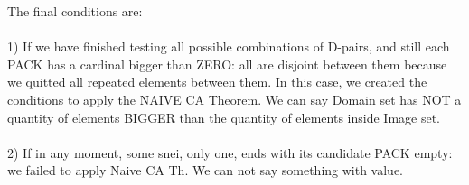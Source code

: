 	\noindent
	The final conditions are:\\\\
	1) If we have finished testing all possible combinations of D-pairs, and still each PACK has a cardinal bigger than ZERO: all are disjoint between them because we quitted all repeated elements between them. In this case, we created the conditions to apply the NAIVE CA Theorem. We can say Domain set has NOT a quantity of elements BIGGER than the quantity of elements inside Image set.\\\\
	2) If in any moment, some snei, only one, ends with its candidate PACK empty: we failed to apply Naive CA Th. We can not say something with value.
	\\\\
	 
	
	
	
	
	
	
	
	
	